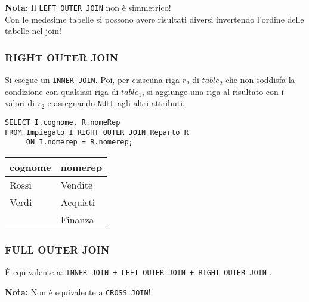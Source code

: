 \documentclass[a4paper, 10pt]{article}
\begin{document}
			\noindent
			\textbf{Nota: } Il \lstinline|LEFT OUTER JOIN| non è simmetrico! \\
			Con le medesime tabelle si possono avere risultati diversi invertendo l’ordine
			delle tabelle nel join!
		\subsubsection*{RIGHT OUTER JOIN}
			Si esegue un \lstinline|INNER JOIN|. Poi, per ciascuna riga $ r_2 $ di $ table_2 $ che non
			soddisfa la condizione con qualsiasi riga di $ table_1 $, si aggiunge una riga al
			risultato con i valori di $ r_2 $ e assegnando \lstinline|NULL| agli altri attributi.
			
			\bigskip
			\noindent
			\begin{minipage}{0.67\textwidth}
					\begin{lstlisting}
SELECT I.cognome, R.nomeRep
FROM Impiegato I RIGHT OUTER JOIN Reparto R 
     ON I.nomerep = R.nomerep;
					\end{lstlisting}
				\end{minipage}\hfilneg\vrule\hfill
			\begin{minipage}{.28\textwidth}
					\begin{tabular}{ll}
							\toprule
							\textbf{cognome} & \textbf{nomerep} \\
							\midrule
							Rossi & Vendite \\
							Verdi & Acquisti \\
							& Finanza \\
							\midrule
						\end{tabular}
					\end{minipage}
	
		\subsubsection*{FULL OUTER JOIN}
			È equivalente a: \lstinline|INNER JOIN + LEFT OUTER JOIN + RIGHT OUTER JOIN| .
			
			\noindent
			\textbf{Nota: }Non è equivalente a \lstinline|CROSS JOIN|!
			
\end{document}
